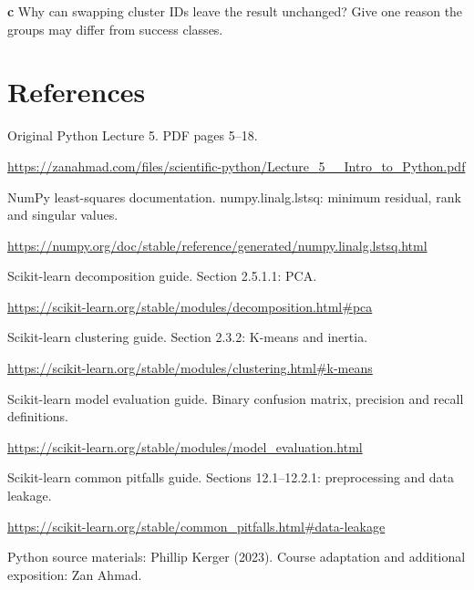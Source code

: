 \documentclass[11pt,letterpaper]{article}
\theoremstyle{definition}\newtheorem{definition}{Definition}\newtheorem{example}{Example}
\numberwithin{equation}{section}
\begin{document}
\textbf{c} Why can swapping cluster IDs leave the result unchanged? Give one reason the groups may differ from success classes.

\section*{References}
\noindent\begin{minipage}{\linewidth}
Original Python Lecture 5. PDF pages 5--18.

\url{https://zanahmad.com/files/scientific-python/Lecture_5__Intro_to_Python.pdf}
\end{minipage}\par\medskip
\noindent\begin{minipage}{\linewidth}
NumPy least-squares documentation. numpy.linalg.lstsq: minimum residual, rank and singular values.

\url{https://numpy.org/doc/stable/reference/generated/numpy.linalg.lstsq.html}
\end{minipage}\par\medskip
\noindent\begin{minipage}{\linewidth}
Scikit-learn decomposition guide. Section 2.5.1.1: PCA.

\url{https://scikit-learn.org/stable/modules/decomposition.html#pca}
\end{minipage}\par\medskip
\noindent\begin{minipage}{\linewidth}
Scikit-learn clustering guide. Section 2.3.2: K-means and inertia.

\url{https://scikit-learn.org/stable/modules/clustering.html#k-means}
\end{minipage}\par\medskip
\noindent\begin{minipage}{\linewidth}
Scikit-learn model evaluation guide. Binary confusion matrix, precision and recall definitions.

\url{https://scikit-learn.org/stable/modules/model_evaluation.html}
\end{minipage}\par\medskip
\noindent\begin{minipage}{\linewidth}
Scikit-learn common pitfalls guide. Sections 12.1--12.2.1: preprocessing and data leakage.

\url{https://scikit-learn.org/stable/common_pitfalls.html#data-leakage}
\end{minipage}\par\medskip
Python source materials: Phillip Kerger (2023). Course adaptation and additional exposition: Zan Ahmad.
\end{document}
